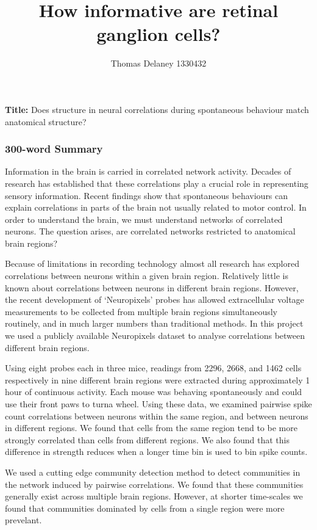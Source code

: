 \documentclass[a4paper,12pt]{article}
\title{How informative are retinal ganglion cells?}
\author{Thomas Delaney 1330432}
\theoremstyle{definition}
\begin{document}
\noindent
\textbf{Title:} Does structure in neural correlations during spontaneous behaviour match anatomical structure?

\subsubsection*{300-word Summary}
Information in the brain is carried in correlated network activity. Decades of research has established that these correlations play a crucial role in representing sensory information\cite{cohen1}. Recent findings show that spontaneous behaviours can explain correlations in parts of the brain not usually related to motor control\cite{stringer}. In order to understand the brain, we must understand networks of correlated neurons. The question arises, are correlated networks restricted to anatomical brain regions?

Because of limitations in recording technology almost all research has explored correlations between neurons within a given brain region. Relatively little is known about correlations between neurons in different brain regions. However, the recent development of `Neuropixels' probes\cite{jun} has allowed extracellular voltage measurements to be collected from multiple brain regions simultaneously routinely, and in much larger numbers than traditional methods. In this project we used a publicly available Neuropixels dataset to analyse correlations between different brain regions.

Using eight probes each in three mice, readings from 2296, 2668, and 1462 cells respectively in nine different brain regions were extracted during approximately 1 hour of continuous activity. Each mouse was behaving spontaneously and could use their front paws to turna wheel\cite{stringer}. Using these data, we examined pairwise spike count correlations between neurons within the same region, and between neurons in different regions. We found that cells from the same region tend to be more strongly correlated than cells from different regions. We also found that this difference in strength reduces when a longer time bin is used to bin spike counts.

We used a cutting edge community detection method\cite{humphries} to detect communities in the network induced by pairwise correlations. We found that these communities generally exist across multiple brain regions. However, at shorter time-scales we found that communities dominated by cells from a single region were more prevelant. 
\end{document}
